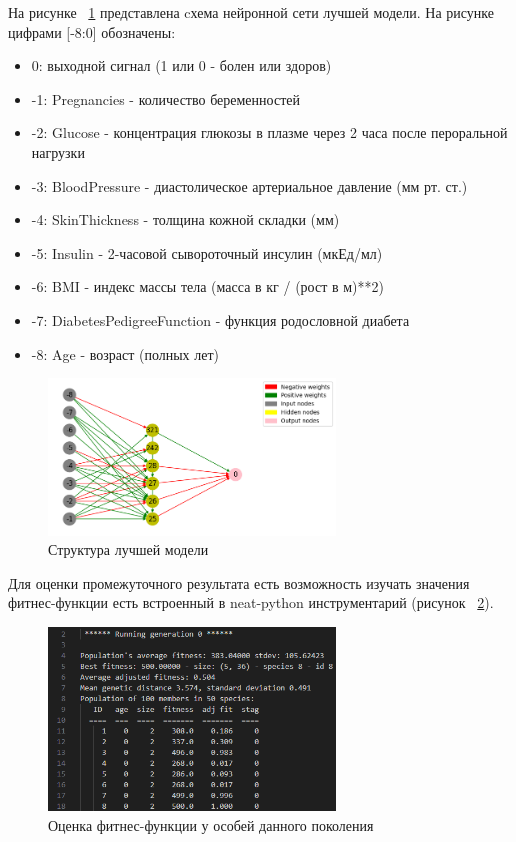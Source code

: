 \documentclass{article}
\begin{document}
На рисунке ~\ref{fig:Output2} представлена cхема нейронной сети лучшей модели. На рисунке цифрами [-8:0] обозначены:
\begin{itemize}
    \item 0: выходной сигнал (1 или 0 - болен или здоров)
    \item -1: Pregnancies - количество беременностей
    \item -2: Glucose - концентрация глюкозы в плазме через 2 часа после пероральной нагрузки
    \item -3: BloodPressure - диастолическое артериальное давление (мм рт. ст.)
    \item -4: SkinThickness - толщина кожной складки (мм)
    \item -5: Insulin - 2-часовой сывороточный инсулин (мкЕд/мл)
    \item -6: BMI - индекс массы тела (масса в кг / (рост в м)**2)
    \item -7: DiabetesPedigreeFunction - функция родословной диабета
    \item -8: Age - возраст (полных лет)
\end{itemize}

\begin{figure}[h]
	\centering
    \includegraphics[width=3in]{output2}
    \caption{Структура лучшей модели}
    \label{fig:Output2}
\end{figure}

Для оценки промежуточного результата есть возможность изучать значения фитнес-функции есть встроенный в neat-python инструментарий (рисунок ~\ref{fig:Output4}).

\begin{figure}[h]
	\centering
    \includegraphics[width=3in]{output4}
    \caption{Оценка фитнес-функции у особей данного поколения}
    \label{fig:Output4}
\end{figure}
\end{document}
